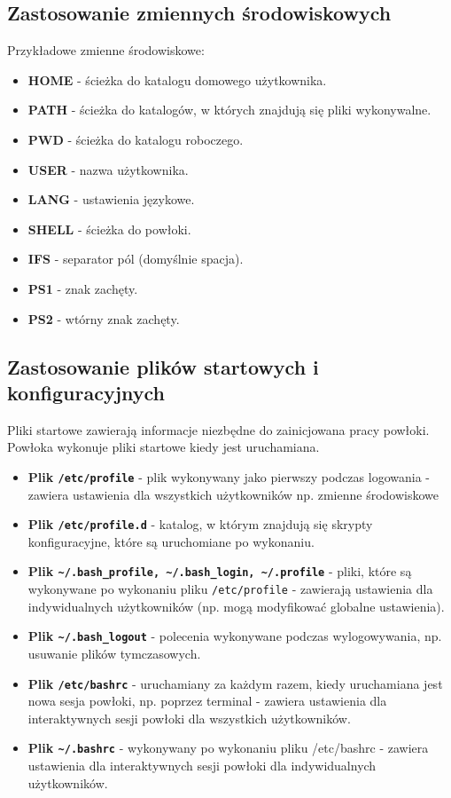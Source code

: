 \documentclass{article}
\begin{document}
\subsection{Zastosowanie zmiennych środowiskowych}
Przykładowe zmienne środowiskowe:
\begin{itemize}
    \item \textbf{HOME} - ścieżka do katalogu domowego użytkownika.
    \item \textbf{PATH} - ścieżka do katalogów, w których znajdują się pliki wykonywalne.
    \item \textbf{PWD} - ścieżka do katalogu roboczego.
    \item \textbf{USER} - nazwa użytkownika.
    \item \textbf{LANG} - ustawienia językowe.
    \item \textbf{SHELL} - ścieżka do powłoki.
    \item \textbf{IFS} - separator pól (domyślnie spacja).
    \item \textbf{PS1} - znak zachęty.
    \item \textbf{PS2} - wtórny znak zachęty.
\end{itemize}

\subsection{Zastosowanie plików startowych i konfiguracyjnych}
Pliki startowe zawierają informacje niezbędne do zainicjowana pracy powłoki. Powłoka wykonuje pliki startowe kiedy jest uruchamiana.
\begin{itemize}
    \item \textbf{Plik \texttt{/etc/profile}} - plik wykonywany jako pierwszy podczas logowania - zawiera ustawienia dla wszystkich użytkowników np. zmienne środowiskowe
    \item \textbf{Plik \texttt{/etc/profile.d}} - katalog, w którym znajdują się skrypty konfiguracyjne, które są uruchomiane po wykonaniu.
    \item \textbf{Plik \texttt{\textasciitilde/.bash\_profile, \textasciitilde/.bash\_login, \textasciitilde/.profile}} - pliki, które są wykonywane po wykonaniu pliku \texttt{/etc/profile} - zawierają ustawienia dla indywidualnych użytkowników (np. mogą modyfikować globalne ustawienia).
    \item \textbf{Plik \texttt{\textasciitilde/.bash\_logout}} - polecenia wykonywane podczas wylogowywania, np. usuwanie plików tymczasowych.
    \item \textbf{Plik \texttt{/etc/bashrc}} - uruchamiany za każdym razem, kiedy uruchamiana jest nowa sesja powłoki, np. poprzez terminal - zawiera ustawienia dla interaktywnych sesji powłoki dla wszystkich użytkowników.
    \item \textbf{Plik \texttt{\textasciitilde/.bashrc}} - wykonywany po wykonaniu pliku /etc/bashrc - zawiera ustawienia dla interaktywnych sesji powłoki dla indywidualnych użytkowników.
\end{itemize}
\end{document}
